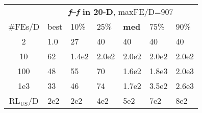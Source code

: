 \begin{tabular}{c|llllll}
 & \multicolumn{6}{|c}{\textbf{\textit{f}\raisebox{-0.35ex}{1}--\textit{f}\raisebox{-0.35ex}{24} in 20-D}, maxFE/D=907}\\
\#FEs/D & best & 10\% & 25\% & \textbf{med} & 75\% & 90\%\\
2 & \hspace*{1ex}1.0 & 27 & 40 & 40 & 40 & 40\\
10 & 62 & 1.4e2 & 2.0e2 & 2.0e2 & 2.0e2 & 2.0e2\\
100 & 48 & 55 & 70 & 1.6e2 & 1.8e3 & 2.0e3\\
1e3 & 33 & 46 & 74 & 1.7e2 & 3.5e2 & 2.6e3\\
$\text{RL}_{\text{US}}$/D & 2e2 & 2e2 & 4e2 & 5e2 & 7e2 & 8e2
\end{tabular}
